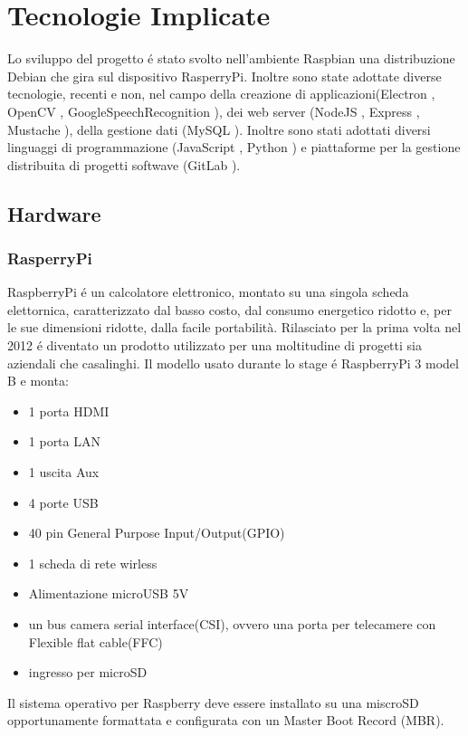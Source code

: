 \chapter{Tecnologie Implicate}

Lo sviluppo del progetto \'e stato svolto nell'ambiente Raspbian\cite{Raspbian}
una distribuzione Debian\cite{Debian} che gira sul dispositivo RasperryPi\cite{Raspberry}.
Inoltre sono state adottate diverse tecnologie, recenti
e non, nel campo della creazione di applicazioni(Electron \cite{Electron-website},
OpenCV \cite{OpenCV-website}, GoogleSpeechRecognition \cite{GoogleSTT-website}),
dei web server (NodeJS \cite{NodeJS-website}, Express \cite{Express-website}, Mustache \cite{Mustache}),
della gestione dati (MySQL \cite{MySQL}).
Inoltre sono stati adottati diversi linguaggi di programmazione (JavaScript \cite{JavaScript}, Python \cite{Python})
e piattaforme per la gestione distribuita di progetti softwave (GitLab \cite{git-website}).

\section{Hardware}
\subsection{RasperryPi}
RaspberryPi \'e un calcolatore elettronico, montato su una singola scheda elettornica,
caratterizzato dal basso costo, dal consumo energetico ridotto e, per le sue
dimensioni ridotte, dalla facile portabilità.
Rilasciato per la prima volta nel 2012 \'e diventato un prodotto utilizzato per una moltitudine
di progetti sia aziendali che casalinghi.
Il modello usato durante lo stage \'e RaspberryPi 3 model B e monta:
\begin{itemize}
\item 1 porta HDMI
\item 1 porta LAN
\item 1 uscita Aux
\item 4 porte USB
\item 40 pin General Purpose Input/Output(GPIO)
\item 1 scheda di rete wirless
\item Alimentazione microUSB 5V
\item un bus camera serial interface(CSI), ovvero una porta per telecamere con Flexible flat cable(FFC)
\item ingresso per microSD
\end{itemize}
Il sistema operativo per Raspberry deve essere installato su una miscroSD opportunamente formattata
e configurata con un Master Boot Record (MBR).

